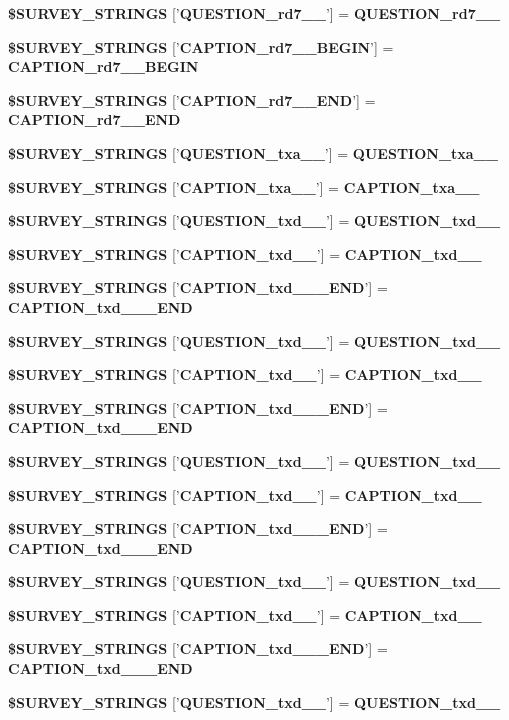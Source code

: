 \begin{CompactItemize}
{\bf \$SURVEY\_\-STRINGS} ['{\bf QUESTION\_\-rd7\_\_\-}'] = {\bf QUESTION\_\-rd7\_\_\-}
\item 
{\bf \$SURVEY\_\-STRINGS} ['{\bf CAPTION\_\-rd7\_\_\-BEGIN}'] = {\bf CAPTION\_\-rd7\_\_\-BEGIN}
\item 
{\bf \$SURVEY\_\-STRINGS} ['{\bf CAPTION\_\-rd7\_\_\-END}'] = {\bf CAPTION\_\-rd7\_\_\-END}
\item 
{\bf \$SURVEY\_\-STRINGS} ['{\bf QUESTION\_\-txa\_\_\-}'] = {\bf QUESTION\_\-txa\_\_\-}
\item 
{\bf \$SURVEY\_\-STRINGS} ['{\bf CAPTION\_\-txa\_\_\-}'] = {\bf CAPTION\_\-txa\_\_\-}
\item 
{\bf \$SURVEY\_\-STRINGS} ['{\bf QUESTION\_\-txd\_\_\-}'] = {\bf QUESTION\_\-txd\_\_\-}
\item 
{\bf \$SURVEY\_\-STRINGS} ['{\bf CAPTION\_\-txd\_\_\-}'] = {\bf CAPTION\_\-txd\_\_\-}
\item 
{\bf \$SURVEY\_\-STRINGS} ['{\bf CAPTION\_\-txd\_\_\-\_\-END}'] = {\bf CAPTION\_\-txd\_\_\-\_\-END}
\item 
{\bf \$SURVEY\_\-STRINGS} ['{\bf QUESTION\_\-txd\_\_\-}'] = {\bf QUESTION\_\-txd\_\_\-}
\item 
{\bf \$SURVEY\_\-STRINGS} ['{\bf CAPTION\_\-txd\_\_\-}'] = {\bf CAPTION\_\-txd\_\_\-}
\item 
{\bf \$SURVEY\_\-STRINGS} ['{\bf CAPTION\_\-txd\_\_\-\_\-END}'] = {\bf CAPTION\_\-txd\_\_\-\_\-END}
\item 
{\bf \$SURVEY\_\-STRINGS} ['{\bf QUESTION\_\-txd\_\_\-}'] = {\bf QUESTION\_\-txd\_\_\-}
\item 
{\bf \$SURVEY\_\-STRINGS} ['{\bf CAPTION\_\-txd\_\_\-}'] = {\bf CAPTION\_\-txd\_\_\-}
\item 
{\bf \$SURVEY\_\-STRINGS} ['{\bf CAPTION\_\-txd\_\_\-\_\-END}'] = {\bf CAPTION\_\-txd\_\_\-\_\-END}
\item 
{\bf \$SURVEY\_\-STRINGS} ['{\bf QUESTION\_\-txd\_\_\-}'] = {\bf QUESTION\_\-txd\_\_\-}
\item 
{\bf \$SURVEY\_\-STRINGS} ['{\bf CAPTION\_\-txd\_\_\-}'] = {\bf CAPTION\_\-txd\_\_\-}
\item 
{\bf \$SURVEY\_\-STRINGS} ['{\bf CAPTION\_\-txd\_\_\-\_\-END}'] = {\bf CAPTION\_\-txd\_\_\-\_\-END}
\item 
{\bf \$SURVEY\_\-STRINGS} ['{\bf QUESTION\_\-txd\_\_\-}'] = {\bf QUESTION\_\-txd\_\_\-}
\item 

\end{CompactItemize}
